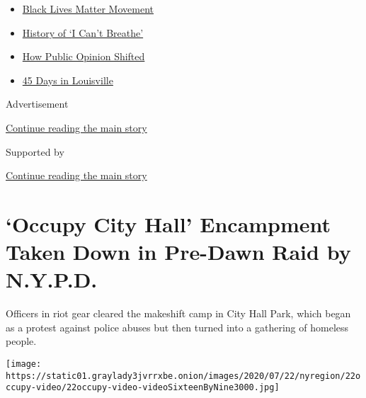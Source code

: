 \begin{itemize}
\tightlist
\item
  \href{https://www.nytimes3xbfgragh.onion/interactive/2020/07/03/us/george-floyd-protests-crowd-size.html?name=styln-george-floyd\&region=TOP_BANNER\&variant=undefined\&block=storyline_menu_recirc\&action=click\&pgtype=Article\&impression_id=8dfd67f1-e38d-11ea-9429-99c7ddc8e385}{Black
  Lives Matter Movement}
\item
  \href{https://www.nytimes3xbfgragh.onion/interactive/2020/06/28/us/i-cant-breathe-police-arrest.html?name=styln-george-floyd\&region=TOP_BANNER\&variant=undefined\&block=storyline_menu_recirc\&action=click\&pgtype=Article\&impression_id=8dfd8f00-e38d-11ea-9429-99c7ddc8e385}{History
  of `I Can't Breathe'}
\item
  \href{https://www.nytimes3xbfgragh.onion/interactive/2020/06/10/upshot/black-lives-matter-attitudes.html?name=styln-george-floyd\&region=TOP_BANNER\&variant=undefined\&block=storyline_menu_recirc\&action=click\&pgtype=Article\&impression_id=8dfd8f01-e38d-11ea-9429-99c7ddc8e385}{How
  Public Opinion Shifted}
\item
  \href{https://www.nytimes3xbfgragh.onion/interactive/2020/07/16/us/black-lives-matter-protests-louisville-breonna-taylor.html?name=styln-george-floyd\&region=TOP_BANNER\&variant=undefined\&block=storyline_menu_recirc\&action=click\&pgtype=Article\&impression_id=8dfd8f02-e38d-11ea-9429-99c7ddc8e385}{45
  Days in Louisville}
\end{itemize}

Advertisement

\protect\hyperlink{after-top}{Continue reading the main story}

Supported by

\protect\hyperlink{after-sponsor}{Continue reading the main story}

\hypertarget{occupy-city-hall-encampment-taken-down-in-pre-dawn-raid-by-nypd}{%
\section{`Occupy City Hall' Encampment Taken Down in Pre-Dawn Raid by
N.Y.P.D.}\label{occupy-city-hall-encampment-taken-down-in-pre-dawn-raid-by-nypd}}

Officers in riot gear cleared the makeshift camp in City Hall Park,
which began as a protest against police abuses but then turned into a
gathering of homeless people.

\texttt{[image: https://static01.graylady3jvrrxbe.onion/images/2020/07/22/nyregion/22occupy-video/22occupy-video-videoSixteenByNine3000.jpg]}

